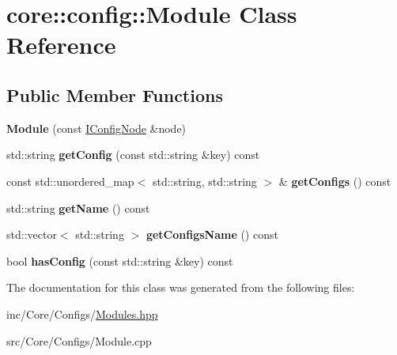 \hypertarget{classcore_1_1config_1_1Module}{}\section{core\+:\+:config\+:\+:Module Class Reference}
\label{classcore_1_1config_1_1Module}
\subsection*{Public Member Functions}
\begin{DoxyCompactItemize}
\item 
\mbox{\label{classcore_1_1config_1_1Module_ad9499dfd277f1b8fc1053eb3198997e1}} 
{\bfseries Module} (const \hyperlink{classIConfigNode}{I\+Config\+Node} \&node)
\item 
\mbox{\label{classcore_1_1config_1_1Module_ae29c6550fd5092bde84347a1271c185c}} 
std\+::string {\bfseries get\+Config} (const std\+::string \&key) const
\item 
\mbox{\label{classcore_1_1config_1_1Module_a1c7445a5221ebeaa5980e84877339775}} 
const std\+::unordered\+\_\+map$<$ std\+::string, std\+::string $>$ \& {\bfseries get\+Configs} () const
\item 
\mbox{\label{classcore_1_1config_1_1Module_af8dc4282af9a07b33fcad56931d9d6c3}} 
std\+::string {\bfseries get\+Name} () const
\item 
\mbox{\label{classcore_1_1config_1_1Module_a352e825070ab2e7566de1c1cc97fa93a}} 
std\+::vector$<$ std\+::string $>$ {\bfseries get\+Configs\+Name} () const
\item 
\mbox{\label{classcore_1_1config_1_1Module_a304e4e49730ee44150843b1823bcb6ef}} 
bool {\bfseries has\+Config} (const std\+::string \&key) const
\end{DoxyCompactItemize}


The documentation for this class was generated from the following files\+:\begin{DoxyCompactItemize}
\item 
inc/\+Core/\+Configs/\hyperlink{Modules_8hpp}{Modules.\+hpp}\item 
src/\+Core/\+Configs/Module.\+cpp\end{DoxyCompactItemize}
